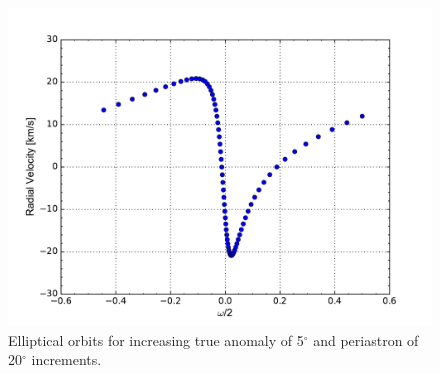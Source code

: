 \documentclass[onecolumn]{aastex6}
\begin{document}
\begin{figure}[ht]
  \includegraphics[scale=0.3]{i.pdf}%




  \caption{Elliptical orbits for increasing true anomaly of 5$^\circ$ and periastron of 20$^\circ$ increments.}
  \label{distancevel}
\end{figure}
\end{document}
